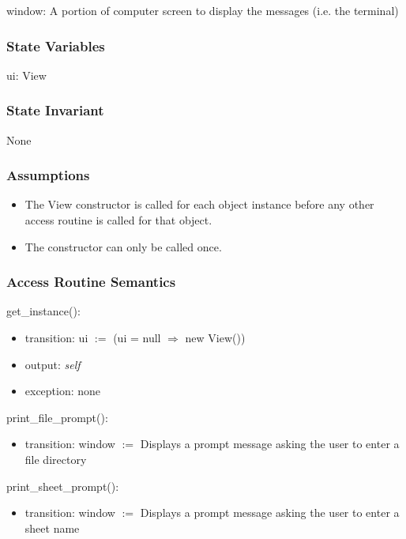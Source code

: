 \documentclass[12pt]{article}
\begin{document}
window: A portion of computer screen to display the messages (i.e. the terminal)

\subsubsection* {State Variables}

ui: View

\subsubsection* {State Invariant}

None

\subsubsection* {Assumptions}

\begin{itemize}
  \item The View constructor is called for each object instance before any 
  other access routine is called for that object.  
  \item The constructor can only be called once.
\end{itemize}


\subsubsection* {Access Routine Semantics}

\noindent get\_instance():
\begin{itemize}
\item transition: ui $:=$ (ui = null $\Rightarrow$ new View())
\item output: \textit{self}
\item exception: none
\end{itemize}

\noindent print\_file\_prompt():
\begin{itemize}
\item transition: window $:=$ Displays a prompt message asking the user to enter a file directory
\end{itemize}

\noindent print\_sheet\_prompt():
\begin{itemize}
\item transition: window $:=$ Displays a prompt message asking the user to enter a sheet name
\end{itemize}
\end{document}
